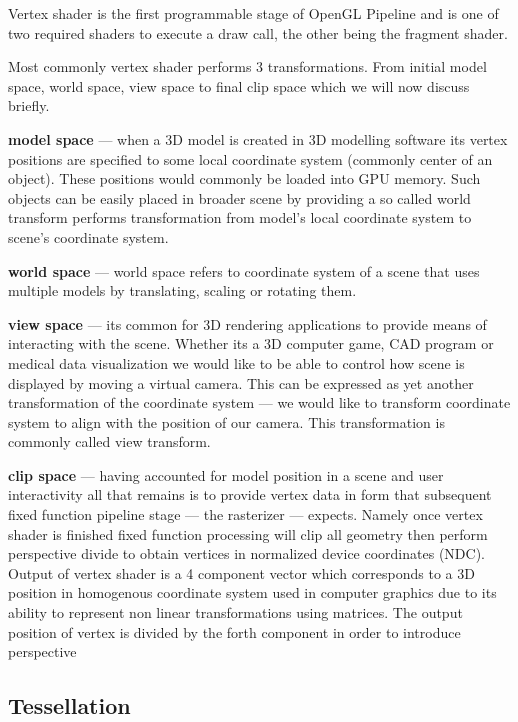Vertex shader is the first programmable stage of OpenGL Pipeline and is one of two required shaders to execute a draw call, the other being the fragment shader.

Most commonly vertex shader performs 3 transformations. From initial model space, world space, view space to final clip space which we will now discuss briefly.

\textbf{model space} --- when a 3D model is created in 3D modelling software its vertex positions are specified to some local coordinate system (commonly center of an object).
These positions would commonly be loaded into GPU memory. Such objects can be easily placed in broader scene by providing a so called world transform performs transformation from model's local coordinate system
to scene's coordinate system.

\textbf{world space} --- world space refers to coordinate system of a scene that uses multiple models by translating, scaling or rotating them.

\textbf{view space} --- its common for 3D rendering applications to provide means of interacting with the scene. Whether its a 3D computer game, CAD program or medical data visualization we would like to be able to 
control how scene is displayed by moving a virtual camera. This can be expressed as yet another transformation of the coordinate system --- we would like to transform coordinate system to align with the position of our camera.
This transformation is commonly called view transform.

\textbf{clip space} --- having accounted for model position in a scene and user interactivity all that remains is to provide vertex data in form that subsequent fixed function pipeline stage --- the rasterizer --- expects.
Namely once vertex shader is finished fixed function processing will clip all geometry then perform perspective divide to obtain vertices in normalized device coordinates (NDC).
Output of vertex shader is a 4 component vector which corresponds to a 3D position in homogenous coordinate system used in computer graphics due to its ability to represent non linear transformations using matrices.
The output position of vertex is divided by the forth component in order to introduce perspective 

\subsection{Tessellation}

